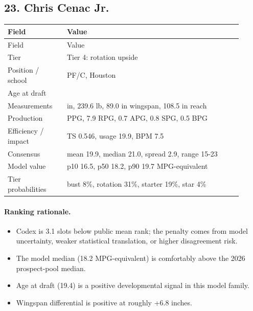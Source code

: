 \documentclass[11pt]{article}
\begin{document}
\subsection{23. Chris Cenac Jr.}
\begin{center}
\scriptsize
\begin{longtable}{@{}>{\raggedright\arraybackslash}p{0.230\linewidth}>{\raggedright\arraybackslash}p{0.680\linewidth}@{}}
\toprule
Field & Value \\
\midrule
\endfirsthead
\toprule
Field & Value \\
\midrule
\endhead
Tier & Tier 4: rotation upside \\
Position / school & PF/C, Houston \\
Age at draft & 19.4 \\
Measurements & 82.2 in, 239.6 lb, 89.0 in wingspan, 108.5 in reach \\
Production & 9.5 PPG, 7.9 RPG, 0.7 APG, 0.8 SPG, 0.5 BPG \\
Efficiency / impact & TS 0.546, usage 19.9, BPM 7.5 \\
Consensus & mean 19.9, median 21.0, spread 2.9, range 15-23 \\
Model value & p10 16.5, p50 18.2, p90 19.7 MPG-equivalent \\
Tier probabilities & bust 8\%, rotation 31\%, starter 19\%, star 4\% \\
\bottomrule
\end{longtable}
\end{center}

\paragraph{Ranking rationale.}
\begin{itemize}[leftmargin=*]
\item Codex is 3.1 slots below public mean rank; the penalty comes from model uncertainty, weaker statistical translation, or higher disagreement risk.
\item The model median (18.2 MPG-equivalent) is comfortably above the 2026 prospect-pool median.
\item Age at draft (19.4) is a positive developmental signal in this model family.
\item Wingspan differential is positive at roughly +6.8 inches.
\end{itemize}
\end{document}
